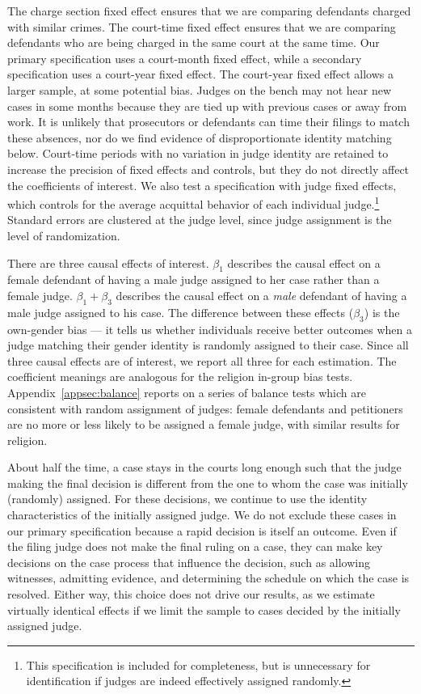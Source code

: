 \documentclass[12pt,english]{article}
\begin{document}
The charge section fixed effect ensures that we are comparing defendants charged with similar crimes. The court-time fixed effect ensures that we are comparing defendants who are being charged in the same court at the same time. Our primary specification uses a court-month fixed effect, while a secondary specification uses a court-year fixed effect. The court-year fixed effect allows a larger sample, at some potential bias. Judges on the bench may not hear new cases in some months because they are tied up with previous cases or away from work. It is unlikely that prosecutors or defendants can time their filings to match these absences, nor do we find evidence of disproportionate identity matching below. Court-time periods with no variation in judge identity are retained to increase the precision of fixed effects and controls, but they do not directly affect the coefficients of interest. We also test a specification with judge fixed effects, which controls for the average acquittal behavior of each individual judge.\footnote{This specification is included for completeness, but is unnecessary for identification if judges are indeed effectively assigned randomly.} Standard errors are clustered at the judge level, since judge assignment is the level of randomization.

There are three causal effects of interest. $\beta_1$ describes the causal effect on a female defendant of having a male judge assigned to her case rather than a female judge. $\beta_1 + \beta_3$ describes the causal effect on a \textit{male} defendant of having a male judge assigned to his case. The difference between these effects ($\beta_3$) is the own-gender bias --- it tells us whether individuals receive better outcomes when a judge matching their gender identity is randomly assigned to their case. Since all three causal effects are of interest, we report all three for each estimation. The coefficient meanings are analogous for the religion in-group bias tests. Appendix~\ref{appsec:balance} reports on a series of balance tests which are consistent with random assignment of judges: female defendants and petitioners are no more or less likely to be assigned a female judge, with similar results for religion.

About half the time, a case stays in the courts long enough such that the judge making the final decision is different from the one to whom the case was initially (randomly) assigned. For these decisions, we continue to use the identity characteristics of the initially assigned judge. We do not exclude these cases in our primary specification because a rapid decision is itself an outcome. Even if the filing judge does not make the final ruling on a case, they can make key decisions on the case process that influence the decision, such as allowing witnesses, admitting evidence, and determining the schedule on which the case is resolved. Either way, this choice does not drive our results, as we estimate virtually identical effects if we limit the sample to cases decided by the initially assigned judge.  
\end{document}
